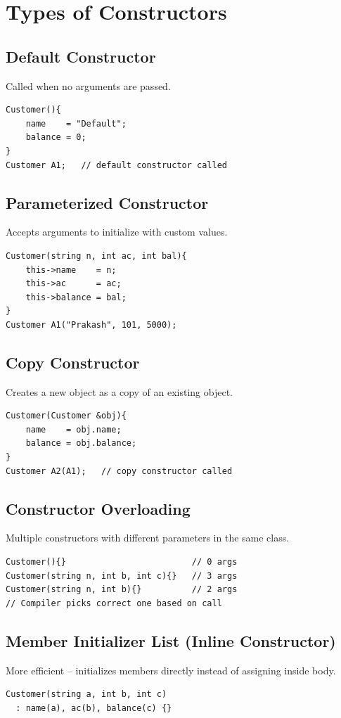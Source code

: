 \documentclass[12pt,a4paper]{report}
\begin{document}
\section{Types of Constructors}

\subsection{Default Constructor}
Called when no arguments are passed.
\begin{lstlisting}
Customer(){
    name    = "Default";
    balance = 0;
}
Customer A1;   // default constructor called
\end{lstlisting}

\subsection{Parameterized Constructor}
Accepts arguments to initialize with custom values.
\begin{lstlisting}
Customer(string n, int ac, int bal){
    this->name    = n;
    this->ac      = ac;
    this->balance = bal;
}
Customer A1("Prakash", 101, 5000);
\end{lstlisting}

\subsection{Copy Constructor}
Creates a new object as a copy of an existing object.
\begin{lstlisting}
Customer(Customer &obj){
    name    = obj.name;
    balance = obj.balance;
}
Customer A2(A1);   // copy constructor called
\end{lstlisting}

\subsection{Constructor Overloading}
Multiple constructors with different parameters in the same class.
\begin{lstlisting}
Customer(){}                         // 0 args
Customer(string n, int b, int c){}   // 3 args
Customer(string n, int b){}          // 2 args
// Compiler picks correct one based on call
\end{lstlisting}

\subsection{Member Initializer List (Inline Constructor)}
More efficient -- initializes members directly instead of assigning inside body.
\begin{lstlisting}
Customer(string a, int b, int c)
  : name(a), ac(b), balance(c) {}
\end{lstlisting}
\end{document}
